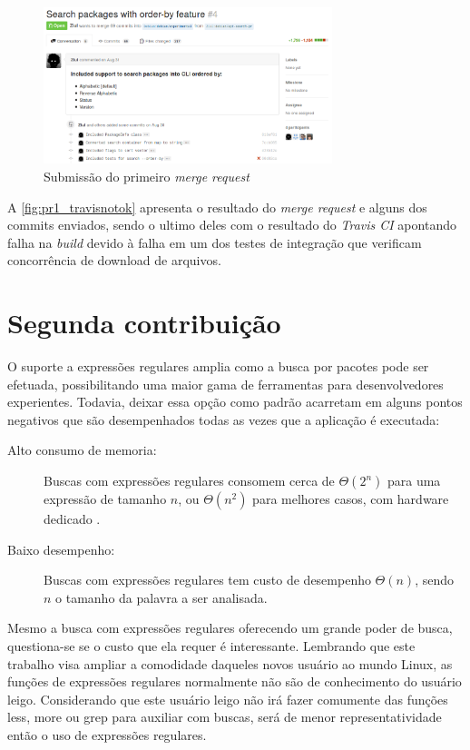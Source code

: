 \begin{figure}[h]
  \centering
	\includegraphics[width=0.75\textwidth]{figuras/pr1}
  \caption{Submissão do primeiro \textit{merge request}}
  \label{fig:pr1_travisnotok}
\end{figure}

A \autoref{fig:pr1_travisnotok} apresenta o resultado do \textit{merge request} e alguns dos commits enviados, sendo o ultimo deles com o resultado do \textit{Travis CI} apontando falha na \textit{build} devido à falha em um dos testes de integração que verificam concorrência de download de arquivos.



\section{Segunda contribuição} %
\label{sec:segunda_contribui_o}

O suporte a expressões regulares amplia como a busca por pacotes pode ser efetuada, possibilitando uma maior gama de ferramentas para desenvolvedores experientes. Todavia, deixar essa opção como padrão acarretam em alguns pontos negativos que são desempenhados todas as vezes que a aplicação é executada:

\begin{description}
	\item [Alto consumo de memoria:] Buscas com expressões regulares consomem cerca de $\Theta(2^n)$ para uma expressão de tamanho $n$, ou $\Theta(n^2)$ para melhores casos, com hardware dedicado \cite{sidhu2001fast}.
	\item [Baixo desempenho:] Buscas com expressões regulares tem custo de desempenho $\Theta(n)$, sendo $n$ o tamanho da palavra a ser analisada.
\end{description}

Mesmo a busca com expressões regulares oferecendo um grande poder de busca, questiona-se se o custo que ela requer é interessante. Lembrando que este trabalho visa ampliar a comodidade daqueles novos usuário ao mundo Linux, as funções de expressões regulares normalmente não são de conhecimento do usuário leigo. Considerando que este usuário leigo não irá fazer comumente das funções {\code less}, {\code more} ou {\code grep} para auxiliar com buscas, será de menor representatividade então o uso de expressões regulares.

